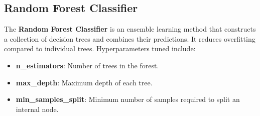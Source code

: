 \documentclass{article}
\begin{document}
    
\subsection{Random Forest Classifier}
The \textbf{Random Forest Classifier} is an ensemble learning method that constructs a collection of decision trees and combines their predictions. It reduces overfitting compared to individual trees. Hyperparameters tuned include:
\begin{itemize}
    \item \textbf{n\_estimators}: Number of trees in the forest.
    \item \textbf{max\_depth}: Maximum depth of each tree.
    \item \textbf{min\_samples\_split}: Minimum number of samples required to split an internal node.
\end{itemize}
\end{document}

